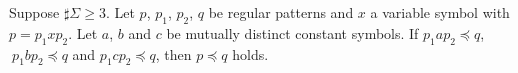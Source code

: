 %
\begin{lem}\label{Sato1:Lemma10}
    Suppose $\sharp \Sigma \geq 3$.
    Let $p$, $p_{1}$, $p_{2}$, $q$ be regular patterns and $x$ a variable symbol with $p = p_{1}xp_{2}$.
    Let $a$, $b$ and $c$ be mutually distinct constant symbols.
    If $p_{1}ap_{2} \preceq q$, $\ p_{1}bp_{2} \preceq q$ and $p_{1}cp_{2} \preceq q$, then $p \preceq q$ holds.
\end{lem}



